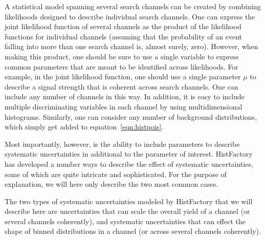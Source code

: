 A statistical model spanning several search channels can be created by combining likelihoods designed to describe individual search channels.
One can express the joint likelihood function of several channels as the product of the likelihood functions for individual channels (assuming that the probability of an event falling into more than one search channel is, almost surely, zero).
However, when making this product, one should be sure to use a single variable to express common parameters that are meant to be identified across likelihoods.
For example, in the joint likelihood function, one should use a single parameter $\mu$ to describe a signal strength that is coherent across search channels.
One can include any number of channels in this way.
In addition, it is easy to include multiple discriminating variables in each channel by using multidimensional histograms.
Similarly, one can consider any number of background distributions, which simply get added to equation~\ref{eqn:histpois}.

Most importantly, however, is the ability to include parameters to describe systematic uncertainties in additional to the parameter of interest.
HistFactory has developed a number ways to describe the effect of systematic uncertainties, some of which are quite intricate and sophisticated.
For the purpose of explanation, we will here only describe the two most common cases.

The two types of systematic uncertainties modeled by HistFactory that we will describe here are uncertainties that can scale the overall yield of a channel (or several channels coherently), and systematic uncertainties that can effect the shape of binned distributions in a channel (or across several channels coherently).

